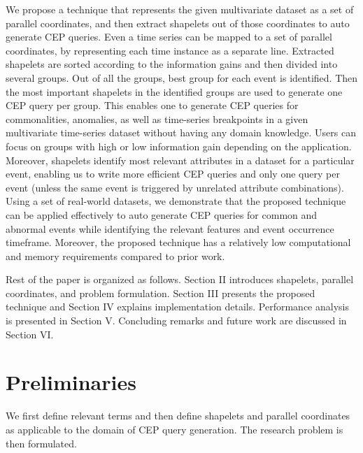 \documentclass[conference]{IEEEtran}  %
\begin{document}
We propose a technique that represents the given multivariate dataset as a set of parallel coordinates, and then extract shapelets out of those coordinates to auto generate CEP queries. Even a time series can be mapped to a set of parallel coordinates, by representing each time instance as a separate line. Extracted shapelets are sorted according to the information gains and then divided into several groups. Out of all the groups, best group for each event is identified. Then the most important shapelets in the identified groups are used to generate one CEP query per group. This enables one to generate CEP queries for commonalities, anomalies, as well as time-series breakpoints in a given multivariate time-series dataset without having any domain knowledge. Users can focus on groups with high or low information gain depending on the application. Moreover, shapelets identify most relevant attributes in a dataset for a particular event, enabling us to write more efficient CEP queries and only one query per event (unless the same event is triggered by unrelated attribute combinations). Using a set of real-world datasets, we demonstrate that the proposed technique can be applied effectively to auto generate CEP queries for common and abnormal events while identifying the relevant features and event occurrence timeframe. Moreover, the proposed technique has a relatively low computational and memory requirements compared to prior work.

Rest of the paper is organized as follows. Section II introduces shapelets, parallel coordinates, and problem formulation. Section III presents the proposed technique and Section IV explains implementation details. Performance analysis is presented in Section V. Concluding remarks and future work are discussed in Section VI.

\section{Preliminaries}
We first define relevant terms and then define shapelets and parallel coordinates as applicable to the domain of CEP query generation. The research problem is then formulated.
\end{document}
